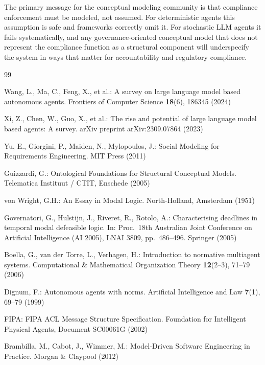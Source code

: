\documentclass[runningheads]{llncs}
\begin{document}
The primary message for the conceptual modeling community is that
compliance enforcement must be modeled, not assumed. For deterministic
agents this assumption is safe and frameworks correctly omit it. For
stochastic LLM agents it fails systematically, and any governance-oriented
conceptual model that does not represent the compliance function as a
structural component will underspecify the system in ways that matter
for accountability and regulatory compliance.

\begin{thebibliography}{99}

Wang, L., Ma, C., Feng, X., et al.:
A survey on large language model based autonomous agents.
Frontiers of Computer Science \textbf{18}(6), 186345 (2024)

Xi, Z., Chen, W., Guo, X., et al.:
The rise and potential of large language model based agents: A survey.
arXiv preprint arXiv:2309.07864 (2023)


Yu, E., Giorgini, P., Maiden, N., Mylopoulos, J.:
Social Modeling for Requirements Engineering.
MIT Press (2011)

Guizzardi, G.:
Ontological Foundations for Structural Conceptual Models.
Telematica Instituut / CTIT, Enschede (2005)

von Wright, G.H.:
An Essay in Modal Logic.
North-Holland, Amsterdam (1951)

Governatori, G., Hulstijn, J., Riveret, R., Rotolo, A.:
Characterising deadlines in temporal modal defeasible logic.
In: Proc.\ 18th Australian Joint Conference on Artificial Intelligence
(AI 2005), LNAI 3809, pp.~486--496. Springer (2005)

Boella, G., van der Torre, L., Verhagen, H.:
Introduction to normative multiagent systems.
Computational \& Mathematical Organization Theory \textbf{12}(2--3),
71--79 (2006)

Dignum, F.:
Autonomous agents with norms.
Artificial Intelligence and Law \textbf{7}(1), 69--79 (1999)

FIPA:
FIPA ACL Message Structure Specification.
Foundation for Intelligent Physical Agents, Document SC00061G (2002)

Brambilla, M., Cabot, J., Wimmer, M.:
Model-Driven Software Engineering in Practice.
Morgan \& Claypool (2012)


\end{thebibliography}
\end{document}
